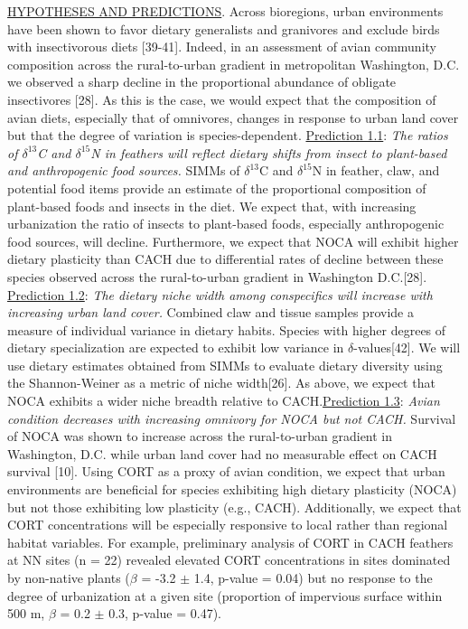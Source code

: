 \documentclass[12pt]{article}
\begin{document}

\noindent \underline{HYPOTHESES AND PREDICTIONS}.  Across bioregions, urban environments have been shown to favor dietary generalists and granivores and exclude birds with insectivorous diets [39-41]. Indeed, in an assessment of avian community composition across the rural-to-urban gradient in metropolitan Washington, D.C. we observed a sharp decline in the proportional abundance of obligate insectivores [28]. As this is the case, we would expect that the composition of avian diets, especially that of omnivores, changes in response to urban land cover but that the degree of variation is species-dependent. \underline{Prediction 1.1}: \textit{The ratios of $\delta^{13}$C and $\delta^{15}$N in feathers will reflect dietary shifts from insect to plant-based and anthropogenic food sources.}  SIMMs of $\delta^{13}$C and  $\delta^{15}$N in feather, claw, and potential food items provide an estimate of the proportional composition of plant-based foods and insects in the diet. We expect that, with increasing urbanization the ratio of insects to plant-based foods, especially anthropogenic food sources, will decline. Furthermore, we expect that NOCA will exhibit higher dietary plasticity than CACH due to differential rates of decline between these species observed across the rural-to-urban gradient in Washington D.C.[28]. \underline{Prediction 1.2}: \textit{The dietary niche width among conspecifics will increase with increasing urban land cover.} Combined claw and tissue samples provide a measure of individual variance in dietary habits. Species with higher degrees of dietary specialization are expected to exhibit low variance in $\delta$-values[42]. We will use dietary estimates obtained from SIMMs to evaluate dietary diversity using the Shannon-Weiner as a metric of niche width[26]. As above, we expect that NOCA exhibits a wider niche breadth relative to CACH.\underline{Prediction 1.3}: \textit{Avian condition decreases with increasing omnivory for NOCA but not CACH.} Survival of NOCA was shown to increase across the rural-to-urban gradient in Washington, D.C. while urban land cover had no measurable effect on CACH survival [10]. Using CORT as a proxy of avian condition, we expect that urban environments are beneficial for species exhibiting high dietary plasticity (NOCA) but not those exhibiting low plasticity (e.g., CACH). Additionally, we expect that CORT concentrations will be especially responsive to local rather than regional habitat variables. For example, preliminary analysis of CORT in CACH feathers at NN sites (n = 22) revealed elevated CORT concentrations in sites dominated by non-native plants ($\beta$ = -3.2 $\pm$ 1.4, p-value = 0.04) but no response to the degree of urbanization at a given site (proportion of impervious surface within 500 m, $\beta$ = 0.2 $\pm$ 0.3, p-value = 0.47). 
\end{document}
